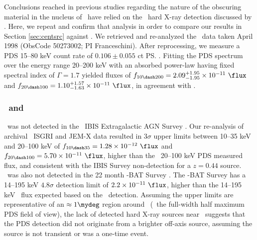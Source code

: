 \documentclass[useAMS,usenatbib]{mn2e}
\begin{document}
\subsubsection{\bepposax}

Conclusions reached in previous studies regarding the nature of the
obscuring material in the nucleus of \irs\ have relied on the
\bepposax\ hard X-ray detection discussed by
\citet{2000A&A...353..910F}. Here, we repeat and confirm that analysis
in order to compare our results in Section \ref{sec:centsrc} against
\citet{2000A&A...353..910F}. We retrieved and re-analyzed the
\bepposax\ data taken April 1998 (ObsCode 50273002; PI
Franceschini). After reprocessing, we measure a PDS 15--80 keV count
rate of $0.106 \pm 0.055$ ct \ps. Fitting the PDS spectrum over the
energy range 20--200 keV with an absorbed power-law having fixed
spectral index of $\Gamma = 1.7$ yielded fluxes of $f_{10 \dash 200} =
2.09^{+1.95}_{-1.95} \times 10^{-11} ~\flux$ and $f_{20 \dash 100} =
1.10^{+1.57}_{-1.63} \times 10^{-11} ~\flux$, in agreement with
\citet{2000A&A...353..910F}.

\subsubsection{\integral\ and \swift}

\irs\ was not detected in the \integral\ IBIS Extragalactic AGN Survey
\citep[][\esens\ = 20--100 keV]{2006ApJ...636L..65B}. Our re-analysis
of archival \integral\ ISGRI and JEM-X data resulted in $3\sigma$
upper limits between 10--35 keV and 20--100 keV of $f_{10 \dash 35} =
1.28 \times 10^{-12} ~\flux$ and $f_{20 \dash 100} = 5.70 \times
10^{-11} ~\flux$, higher than the \bepposax\ 20--100 keV PDS measured
flux, and consistent with the IBIS Survey non-detection for a $z =
0.44$ source. \irs\ was also not detected in the 22 month \swift-BAT
Survey \citep[][\esens\ = 15--150 keV]{2010ApJS..186..378T}. The
\swift-BAT Survey has a 14--195 keV $4.8\sigma$ detection limit of
$2.2 \times 10^{-11} ~\flux$, higher than the 14--195 keV \irs\ flux
expected based on the \bepposax\ detection. Assuming the upper limits
are representative of an $\approx 1\mydeg$ region around
\irs\ (\ie\ the full-width half maximum PDS field of view), the lack
of detected hard X-ray sources near \irs\ suggests that the PDS
detection did not originate from a brighter off-axis source, assuming
the source is not transient or was a one-time event.
\end{document}

